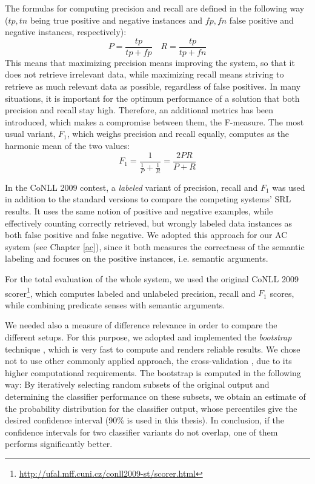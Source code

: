 \documentclass[12pt,notitlepage]{report}
\begin{document}
The formulas for computing precision and recall are defined in the following way ($tp,tn$ being true positive and negative instances and $fp,fn$ false positive and negative instances, respectively):
\begin{equation}
P = \frac{tp}{tp + fp}\quad R = \frac{tp}{tp + fn}
\end{equation}
This means that maximizing precision means improving the system, so that it does not retrieve irrelevant data, while maximizing recall means striving to retrieve as much relevant data as possible, regardless of false positives. In many situations, it is important for the optimum performance of a solution that both precision and recall stay high. Therefore, an additional metrics has been introduced, which makes a compromise between them, the F-measure. The most usual variant, $F_1$, which weighs precision and recall equally, computes as the harmonic mean of the two values:
\begin{equation}
F_1 = \frac{1}{\frac{1}{P} + \frac{1}{R}} = \frac{2PR}{P+R}
\end{equation}

In the CoNLL 2009 contest, a \emph{labeled} variant of precision, recall and $F_1$ \citep{hajic09} was used in addition to the standard versions to compare the competing systems' SRL results. It uses the same notion of positive and negative examples, while effectively counting correctly retrieved, but wrongly labeled data instances as both false positive and false negative. We adopted this approach for our AC system (see Chapter \ref{ac}), since it both measures the correctness of the semantic labeling and focuses on the positive instances, i.e. semantic arguments.

For the total evaluation of the whole system, we used the original CoNLL 2009 scorer\footnote{\url{http://ufal.mff.cuni.cz/conll2009-st/scorer.html}}, which computes labeled and unlabeled precision, recall and $F_1$ scores, while combining predicate senses with semantic arguments.

We needed also a measure of difference relevance in order to compare the different setups. For this purpose, we adopted and implemented the \emph{bootstrap} technique \citep[p. 152]{efron79,witten05}, which is very fast to compute and renders reliable results. We chose not to use other commonly applied approach, the cross-validation \citep[p. 241ff.]{hastie09}, due to its higher computational requirements.
The bootstrap is computed in the following way: By iteratively selecting random subsets of the original output and determining the classifier performance on these subsets, we obtain an estimate of the probability distribution for the classifier output, whose percentiles give the desired confidence interval (90\% is used in this thesis). In conclusion, if the confidence intervals for two classifier variants do not overlap, one of them performs significantly better.
\end{document}
